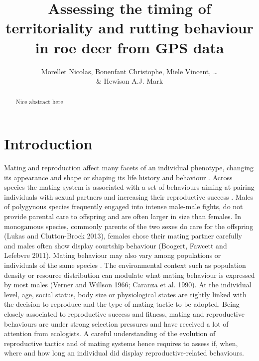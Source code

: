 \documentclass[a4paper,11pt]{article}
\title{Assessing the timing of territoriality and rutting behaviour in
  roe deer from GPS data}
\author{Morellet Nicolas, Bonenfant Christophe, Miele Vincent,
  \ldots\\ \& Hewison A.J. Mark}
\begin{document}
\maketitle

\newpage
\begin{abstract}
Nice abstract here
\end{abstract}

\newpage
\section*{Introduction}

Mating and reproduction affect many facets of an individual phenotype,
changing its appearance and shape or shaping its life history and
behaviour \citep{Darwin1871}. Across species the mating system is
associated with a set of behaviours aiming at pairing individuals with
sexual partners and increasing their reproductive success
\citep{Emlen1977,Clutton-Brock1989a,Wittenberger1979}. Males of
polygynous species frequently engaged into intense male-male fights,
do not provide parental care to offspring and are often larger in size
than females. In monogamous species, commonly parents of the two sexes do care
for the offspring (Lukas and Clutton-Brock 2013), females chose their mating partner carefully and males often show display courtship behaviour (Boogert, Fawcett and Lefebvre 2011). Mating behaviour may also vary among populations or individuals of the same species \citep{Lott1991,Dunbar1982}. The environmental context such as
population density or resource distribution can modulate what mating
behaviour is expressed by most males (Verner and Willson 1966; Caranza
et al. 1990). At the individual level, age, social status, body size
or physiological states are tightly linked with the decision to
reproduce and the type of mating tactic to be adopted. Being closely
associated to reproductive success and fitness, mating and
reproductive behaviours are under strong selection pressures and have
received a lot of attention from ecologists. A careful understanding
of the evolution of reproductive tactics and of mating systems hence
requires to assess if, when, where and how long an individual did
display reproductive-related behaviours.
\end{document}
